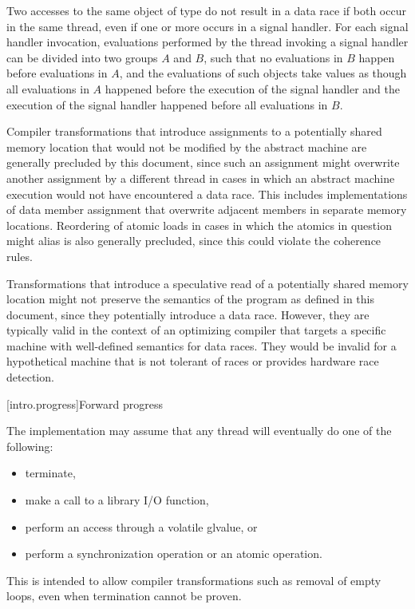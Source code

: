 \pnum
Two accesses to the same object of type  do not
result in a data race if both occur in the same thread, even if one or more
occurs in a signal handler. For each signal handler invocation, evaluations
performed by the thread invoking a signal handler can be divided into two
groups $A$ and $B$, such that no evaluations in
$B$ happen before evaluations in $A$, and the
evaluations of such  objects take values as though
all evaluations in $A$ happened before the execution of the signal
handler and the execution of the signal handler happened before all evaluations
in $B$.

\pnum
\begin{note}
Compiler transformations that introduce assignments to a potentially
shared memory location that would not be modified by the abstract machine are
generally precluded by this document, since such an assignment might overwrite
another assignment by a different thread in cases in which an abstract machine
execution would not have encountered a data race. This includes implementations
of data member assignment that overwrite adjacent members in separate memory
locations. Reordering of atomic loads in cases in which the atomics in question
might alias is also generally precluded, since this could violate the coherence
rules.
\end{note}

\pnum
\begin{note}
Transformations that introduce a speculative read of a potentially
shared memory location might not preserve the semantics of the \Cpp{} program as
defined in this document, since they potentially introduce a data race. However,
they are typically valid in the context of an optimizing compiler that targets a
specific machine with well-defined semantics for data races. They would be
invalid for a hypothetical machine that is not tolerant of races or provides
hardware race detection.
\end{note}

[intro.progress]{Forward progress}

\pnum
The implementation may assume that any thread will eventually do one of the
following:
\begin{itemize}
\item terminate,
\item make a call to a library I/O function,
\item perform an access through a volatile glvalue, or
\item perform a synchronization operation or an atomic operation.
\end{itemize}
\begin{note}
This is intended to allow compiler transformations such as removal of
empty loops, even when termination cannot be proven.
\end{note}

